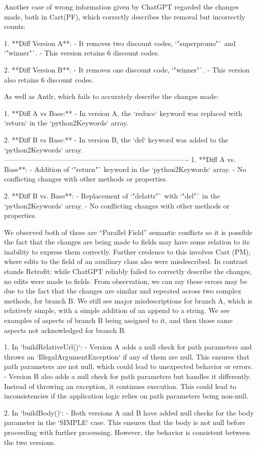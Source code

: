Another case of wrong information given by ChatGPT regarded the changes made, both in Cart(PF), which
correctly describes the removal but incorrectly counts:
\begin{response}
    1. **Diff Version A**:
    - It removes two discount codes, `"superpromo"` and `"winner"`.
    - This version retains 6 discount codes.

 2. **Diff Version B**:
    - It removes one discount code, `"winner"`.
    - This version also retains 6 discount codes.
\end{response}
As well as Antlr, which fails to accurately describe the changes made:
\begin{response}
1. **Diff A vs Base:**
    - In version A, the `reduce` keyword was replaced with `return` in the `python2Keywords` array.

2. **Diff B vs Base:**
    - In version B, the `del` keyword was added to the `python2Keywords` array.
-------------------------------------------------------------------------------
1. **Diff A vs. Base**:
    - Addition of `"return"` keyword in the `python2Keywords` array.
    - No conflicting changes with other methods or properties.

2. **Diff B vs. Base**:
    - Replacement of `"delattr"` with `"del"` in the `python2Keywords` array.
    - No conflicting changes with other methods or properties.
\end{response}
We observed both of these are ``Parallel Field'' semantic conflicts so it is possible the fact that the changes are being made to fields may have some relation to its inability to express them correctly.
Further credence to this involves Cart (PM), where edits to the field of an auxiliary class also were misdescribed.
In contrast stands Retrofit: while ChatGPT reliably failed to correctly describe the changes, no edits were made to fields. From observation, we can say these errors may be due
to the fact that the changes are similar and repeated across two complex methods, for branch B. We still see major misdescriptions for branch A, which is relatively simple, with a simple addition of an append to a string.
We see examples of aspects of branch B being assigned to it, and then those same aspects not acknowledged for branch B.
\begin{response}
    1. In `buildRelativeUrl()`:
    - Version A adds a null check for path parameters and throws an `IllegalArgumentException` if any of them are null. This ensures that path parameters are not null, which could lead to unexpected behavior or errors.
    - Version B also adds a null check for path parameters but handles it differently. Instead of throwing an exception, it continues execution. This could lead to inconsistencies if the application logic relies on path parameters being non-null.

 2. In `buildBody()`:
    - Both versions A and B have added null checks for the body parameter in the `SIMPLE` case. This ensures that the body is not null before proceeding with further processing. However, the behavior is consistent between the two versions.
\end{response}

